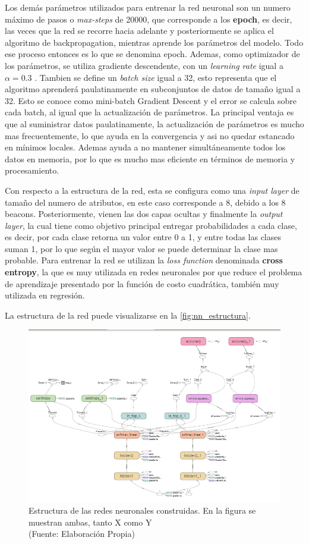 Los demás parámetros utilizados para entrenar la red neuronal son un numero máximo de pasos o \textit{max-steps} de 20000, que corresponde a los \textbf{epoch}, es decir, las veces que la red se recorre hacia adelante y posteriormente se aplica el algoritmo de backpropagation, mientras aprende los parámetros del modelo. Todo ese proceso entonces es lo que se denomina epoch. Ademas, como optimizador de los parámetros, se utiliza gradiente descendente, con un \textit{learning rate}  igual a $\alpha = 0.3$ . Tambien se define un \textit{batch size} igual a 32, esto representa que el algoritmo aprenderá paulatinamente en subconjuntos de datos de tamaño igual a 32. Esto se conoce como mini-batch Gradient Descent y el error se calcula sobre cada batch, al igual que la actualización de parámetros. La principal ventaja es que al suministrar datos paulatinamente, la actualización de parámetros es mucho mas frecuentemente, lo que ayuda en la convergencia y asi no quedar estancado en mínimos locales. Ademas ayuda a no mantener simultáneamente todos los datos en memoria, por lo que es mucho mas eficiente en términos de memoria y procesamiento.

Con respecto a la estructura de la red, esta se configura como una \textit{input layer} de tamaño del numero de atributos, en este caso corresponde a 8, debido a los 8 beacons. Posteriormente, vienen las dos capas ocultas y finalmente la \textit{output layer}, la cual tiene como objetivo principal entregar probabilidades a cada clase, es decir, por cada clase retorna un valor entre 0 a 1, y entre todas las clases suman 1, por lo que según el mayor valor se puede determinar la clase mas probable. Para entrenar la red se utilizan la \textit{loss function} denominada \textbf{cross entropy}, la que es muy utilizada en redes neuronales por que reduce el problema de aprendizaje presentado por la función de costo cuadrática, también muy utilizada en regresión.

La estructura de la red puede visualizarse en la \autoref{fig:nn_estructura}.

\begin{figure}[ht!]
\centering
\includegraphics[width=.6\textwidth]{figures/nn_estructura.png}
\caption[abs]{Estructura de las redes neuronales construidas. En la figura se muestran ambas, tanto X como Y \\
{\scriptsize (Fuente: Elaboración Propia)}}
\label{fig:nn_estructura}
\end{figure}

